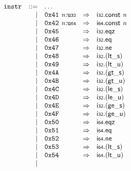 \vspace{1ex}

$$
\begin{array}{@{}l@{}rrlll@{}l@{}}
& {\mathtt{instr}} &::=& \dots \\ &&|&
\mathtt{0x41}~{\mathit{n}}{:}{\mathtt{u{\scriptstyle32}}} &\Rightarrow& \mathsf{i{\scriptstyle32}}.\mathsf{const}~{\mathit{n}} \\ &&|&
\mathtt{0x42}~{\mathit{n}}{:}{\mathtt{u{\scriptstyle64}}} &\Rightarrow& \mathsf{i{\scriptstyle64}}.\mathsf{const}~{\mathit{n}} \\ &&|&
\mathtt{0x45} &\Rightarrow& \mathsf{i{\scriptstyle32}} . \mathsf{eqz} \\ &&|&
\mathtt{0x46} &\Rightarrow& \mathsf{i{\scriptstyle32}} . \mathsf{eq} \\ &&|&
\mathtt{0x47} &\Rightarrow& \mathsf{i{\scriptstyle32}} . \mathsf{ne} \\ &&|&
\mathtt{0x48} &\Rightarrow& \mathsf{i{\scriptstyle32}} . ({\mathsf{lt\_}}{\mathsf{s}}) \\ &&|&
\mathtt{0x49} &\Rightarrow& \mathsf{i{\scriptstyle32}} . ({\mathsf{lt\_}}{\mathsf{u}}) \\ &&|&
\mathtt{0x4A} &\Rightarrow& \mathsf{i{\scriptstyle32}} . ({\mathsf{gt\_}}{\mathsf{s}}) \\ &&|&
\mathtt{0x4B} &\Rightarrow& \mathsf{i{\scriptstyle32}} . ({\mathsf{gt\_}}{\mathsf{u}}) \\ &&|&
\mathtt{0x4C} &\Rightarrow& \mathsf{i{\scriptstyle32}} . ({\mathsf{le\_}}{\mathsf{s}}) \\ &&|&
\mathtt{0x4D} &\Rightarrow& \mathsf{i{\scriptstyle32}} . ({\mathsf{le\_}}{\mathsf{u}}) \\ &&|&
\mathtt{0x4E} &\Rightarrow& \mathsf{i{\scriptstyle32}} . ({\mathsf{ge\_}}{\mathsf{s}}) \\ &&|&
\mathtt{0x4F} &\Rightarrow& \mathsf{i{\scriptstyle32}} . ({\mathsf{ge\_}}{\mathsf{u}}) \\ &&|&
\mathtt{0x50} &\Rightarrow& \mathsf{i{\scriptstyle64}} . \mathsf{eqz} \\ &&|&
\mathtt{0x51} &\Rightarrow& \mathsf{i{\scriptstyle64}} . \mathsf{eq} \\ &&|&
\mathtt{0x52} &\Rightarrow& \mathsf{i{\scriptstyle64}} . \mathsf{ne} \\ &&|&
\mathtt{0x53} &\Rightarrow& \mathsf{i{\scriptstyle64}} . ({\mathsf{lt\_}}{\mathsf{s}}) \\ &&|&
\mathtt{0x54} &\Rightarrow& \mathsf{i{\scriptstyle64}} . ({\mathsf{lt\_}}{\mathsf{u}}) \\ &&|&

\end{array}$$
